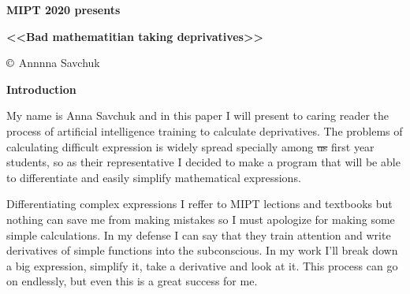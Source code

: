 \documentclass{article}
\begin{document}
\begin{center}
{\bf MIPT 2020 presents}



 \begin{Huge}
{\bf <<Bad mathematitian taking deprivatives>>}
 \end{Huge} 

$\copyright$ Annnna Savchuk
\end{center}
{\bf Introduction}

My name is Anna Savchuk and in this paper I will present to caring reader the process of artificial intelligence training to calculate deprivatives. The problems of calculating difficult expression is widely spread specially among \sout{us} first year students, so as their representative I decided to make a program that will be able to differentiate and easily simplify mathematical expressions.

Differentiating complex expressions I reffer to MIPT lections and textbooks but nothing can save me from making mistakes so I must apologize for making some simple calculations. In my defense I can say that they train attention and write derivatives of simple functions into the subconscious. In my work I'll break down a big expression, simplify it, take a derivative and look at it. This process can go on endlessly, but even this is a great success for me.
\end{document}
